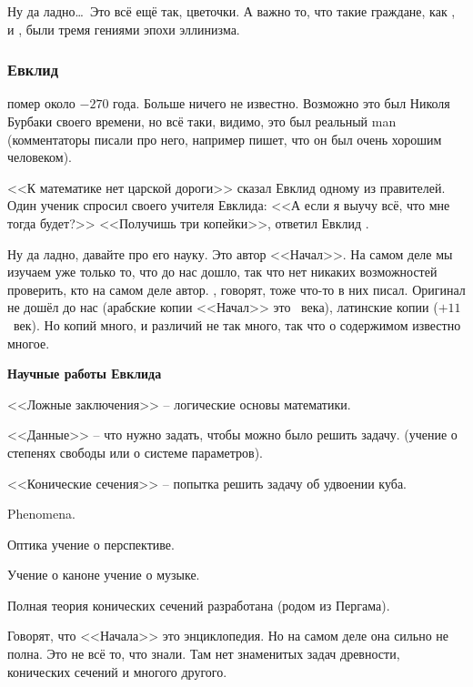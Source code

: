 \documentclass[a4paper,oneside,fleqn,10pt]{article}
\begin{document}
Ну да ладно\ldots\ Это всё ещё так, цветочки. А важно то, что такие
граждане, как ,  и , были
тремя гениями эпохи эллинизма.

\subsubsection{Евклид}

 помер около $-270$ года. Больше ничего не известно.
Возможно это был Николя Бурбаки своего времени, но всё таки, видимо,
это был реальный man (комментаторы писали про него, например
 пишет, что он был очень хорошим человеком).

<<К математике нет царской дороги>> сказал Евклид одному из
правителей.  Один ученик спросил своего учителя Евклида: <<А если я
выучу всё, что мне тогда будет?>> <<Получишь три копейки>>, ответил
Евклид .

Ну да ладно, давайте про его науку.  Это автор <<Начал>>. На самом
деле мы изучаем уже только то, что до нас дошло, так что нет никаких
возможностей проверить, кто на самом деле автор.  , говорят, тоже что-то в них писал. Оригинал не дошёл до
нас (арабские копии <<Начал>> это ~века), латинские копии
($+11$~век).  Но копий много, и различий не так много, так что о
содержимом известно многое.

\textbf{Научные работы Евклида}

\begin{items}{-2}
\item <<Ложные заключения>> -- логические основы математики.
\item <<Данные>> -- что нужно задать, чтобы можно было решить задачу.
  (учение о степенях свободы или о системе параметров).
\item <<Конические сечения>> -- попытка решить задачу об удвоении
  куба.
\item Phenomena.
\item Оптика учение о перспективе.
\item Учение о каноне учение о музыке.
\end{items}

Полная теория конических сечений разработана  (родом из Пергама).

Говорят, что <<Начала>> это энциклопедия. Но на самом деле она сильно
не полна. Это не всё то, что знали. Там нет знаменитых задач
древности, конических сечений и многого другого.
\end{document}
